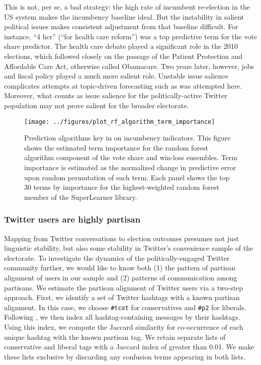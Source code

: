 \documentclass{article}
\begin{document}
This is not, per se, a bad strategy: the high rate of incumbent
re-election in the US system makes the incumbency baseline ideal. But
the instability in salient political issues makes consistent
adjustment from that baseline difficult. For instance, ``4 hcr''
(``for health care reform'') was a
top predictive term for the vote share predictor. The health care debate played a
significant role in the 2010 elections, which followed closely on the
passage of the Patient Protection and Affordable Care Act, otherwise
called Obamacare. Two years later, however, jobs and fiscal policy
played a much more salient role. Unstable issue salience complicates
attempts at topic-driven forecasting such as was attempted
here. Moreover, what counts as issue salience for the
politically-active Twitter population may not prove salient for the
broader electorate. 

\begin{figure}[ht]
  \centering
  \texttt{[image: ../figures/plot\_rf\_algorithm\_term\_importance]}
  \caption{Prediction algorithms key in on incumbency
    indicators. This figure shows the estimated term importance for the random forest algorithm component
    of the vote share and win-loss ensembles. Term importance is
    estimated as the normalized change in predictive error upon
    random permutation of each term. Each panel shows the top
    30 terms by importance for the highest-weighted random forest
    member of the SuperLearner library.}
  \label{fig:rf-term-importance}
\end{figure}

\subsubsection{Twitter users are highly partisan}
\label{sec:part-cont-twitt}

Mapping from Twitter conversations to election outcomes presumes not
just linguistic stability, but also some stability in Twitter's
convenience sample of the electorate. To investigate the dynamics of the
politically-engaged Twitter community further, we would like to know
both (1) the pattern of partisan alignment of users in our sample and
(2) patterns of communication among partisans. We estimate the
partisan alignment of Twitter users via a two-step approach. First, we
identify a set of Twitter hashtags with a known partisan alignment. In
this case, we choose \texttt{\#tcot} for conservatives and
\texttt{\#p2} for liberals. Following \cite{conover2011}, we then
index all hashtag-containing messages by their hashtags. Using this
index, we compute the Jaccard similarity for co-occurrence of each
unique hashtag with the known partisan tag. We retain separate lists
of conservative and liberal tags with a Jaccard index of greater than
0.01. We make these lists exclusive by discarding any confusion terms
appearing in both lists.
\end{document}
